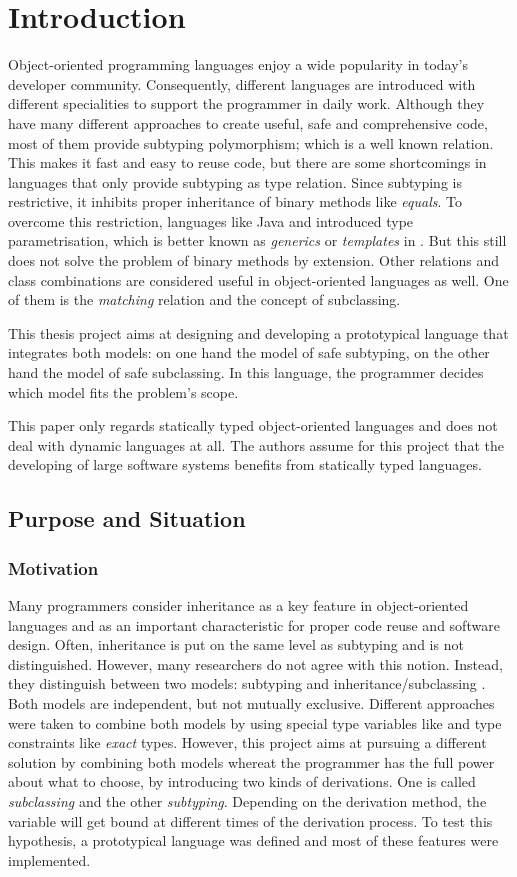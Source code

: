 \chapter{Introduction}
Object-oriented programming languages enjoy a wide popularity in
today's developer community. Consequently, different languages are
introduced with different specialities to support the programmer in
daily work. Although they have many different approaches to create
useful, safe and comprehensive code, most of them provide subtyping
polymorphism; which is a well known relation. This makes it fast and
easy to reuse code, but there are some shortcomings in languages that
only provide subtyping as type relation. Since subtyping is restrictive,
it inhibits proper inheritance of binary methods like \emph{equals}. To
overcome this restriction, languages like Java and \cs introduced
type parametrisation, which is better known as \emph{generics} or
\emph{templates} in \cpp. But this still does not solve the problem of
binary methods by extension. Other relations and class combinations are
considered useful in object-oriented languages as well. One of them is
the \emph{matching} relation and the concept of subclassing.

This thesis project aims at designing and developing a prototypical
language that integrates both models: on one hand the model of safe
subtyping, on the other hand the model of safe subclassing. In this language,
the programmer decides which model fits the problem's scope.

This paper only regards statically typed object-oriented languages and does
not deal with dynamic languages at all. The authors assume for this project
that the developing of large software systems benefits from statically
typed languages.

\section{Purpose and Situation}
\subsection{Motivation}
Many programmers consider inheritance as a key feature in object-oriented
languages and as an important characteristic for proper code reuse and
software design. Often, inheritance is put on the same level as subtyping
and is not distinguished. However, many researchers do not agree with
this notion. Instead, they distinguish between two models: subtyping and
inheritance/subclassing \cite{taivalsaari_notion_1996}.
Both models are independent, but not mutually exclusive. Different approaches were
taken to combine both models by using special type variables like \mytype
and type constraints like \emph{exact} types. However, this project aims at
pursuing a different solution by combining both models whereat the programmer has
the full power about what to choose, by introducing two kinds of derivations.
One is called \emph{subclassing} and the other \emph{subtyping}. Depending
on the derivation method, the \mytype variable will get bound at different
times of the derivation process. To test this hypothesis, a prototypical 
language was defined and most of these features were implemented.


